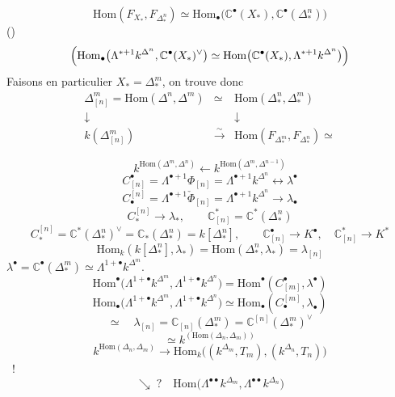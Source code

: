 \documentclass[11pt,a4paper]{article}
\begin{document}
\[
\mathrm{Hom}(F_{X_*},F_{\Delta^n_*}) \simeq \mathrm{Hom}_\bullet\bigl(\mathbb{C}^\bullet(X_*),\mathbb{C}^\bullet(\Delta^n_*)\bigr)
\]
()
\[
\Bigl(\mathrm{Hom}_\bullet\bigl(\Lambda^{*+1}k^{\Delta^n},\mathbb{C}^\bullet(X_*)^\vee\bigr)
\simeq \mathrm{Hom}\bigl(\mathbb{C}^\bullet(X_*),\Lambda^{*+1}k^{\Delta^n}\bigr)\Bigr)
\]
Faisons en particulier $X_* = \Delta^m_*$, on trouve donc
\[
\begin{array}{ccc}
\Delta^m_{[n]} = \mathrm{Hom}(\Delta^n,\Delta^m) & \simeq & \mathrm{Hom}(\Delta^n_*,\Delta^m_*) \\
\downarrow & & \downarrow \\
k(\Delta^m_{[n]}) & \xrightarrow{\;\sim\;} & \mathrm{Hom}(F_{\Delta^m_*},F_{\Delta^n_*}) \simeq
\end{array}
\]

\[
k^{\mathrm{Hom}(\Delta^m,\Delta^n)} \longleftarrow k^{\mathrm{Hom}(\Delta^m,\Delta^{n-1})}
\]
\[
C^\bullet_{[n]} = \Lambda^{\bullet+1}\Phi_{[n]} = \Lambda^{\bullet+1}k^{\Delta^n} \longleftrightarrow \lambda^\bullet
\]
\[
C_\bullet^{[n]} = \Lambda^{\bullet+1}\check\Phi_{[n]} = \Lambda^{\bullet+1}k^{\Delta^n} \longrightarrow \lambda_\bullet
\]
\[
C_*^{[n]} \longrightarrow \lambda_*, \qquad \mathbb{C}^*_{[n]} = \mathbb{C}^*(\Delta^n_*)
\]
\[
C_*^{[n]} = \mathbb{C}^*(\Delta^n_*)^\vee = \mathbb{C}_*(\Delta^n_*) = k[\Delta^n_*], \qquad
\mathbb{C}^\bullet_{[n]} \to K^\bullet, \quad \mathbb{C}^*_{[n]} \to K^*
\]
\[
\mathrm{Hom}_k(k[\Delta^n_*],\lambda_*) = \mathrm{Hom}(\Delta^n_*,\lambda_*) = \lambda_{[n]}
\]
 $\lambda^\bullet = \mathbb{C}^\bullet(\Delta^m_*) \simeq \Lambda^{1+\bullet}k^{\Delta^m}$.
\[
\mathrm{Hom}^\bullet\bigl(\Lambda^{1+\bullet}k^{\Delta^m},\Lambda^{1+\bullet}k^{\Delta^n}\bigr) = \mathrm{Hom}^\bullet(C^\bullet_{[m]},\lambda^\bullet)
\]
\[
\mathrm{Hom}_\bullet\bigl(\Lambda^{1+\bullet}k^{\Delta^m},\Lambda^{1+\bullet}k^{\Delta^n}\bigr) \simeq \mathrm{Hom}_\bullet(C_\bullet^{[m]},\lambda_\bullet)
\]
\[
\simeq \quad \lambda_{[n]} = \mathbb{C}_{[n]}(\Delta^m_*) = \mathbb{C}^{[n]}(\Delta^m_*)^\vee
\]
\[
\simeq k^{(\mathrm{Hom}(\Delta_n,\Delta_m))}
\]
\[
k^{\mathrm{Hom}(\Delta_n,\Delta_m)} \longrightarrow \mathrm{Hom}_k\bigl((k^{\Delta_m},T_m),(k^{\Delta_n},T_n)\bigr)
\]
~!
\[
\searrow\;?\quad \mathrm{Hom}\bigl(\Lambda^{\bullet\bullet}k^{\Delta_m},\Lambda^{\bullet\bullet}k^{\Delta_n}\bigr)
\]
\end{document}
